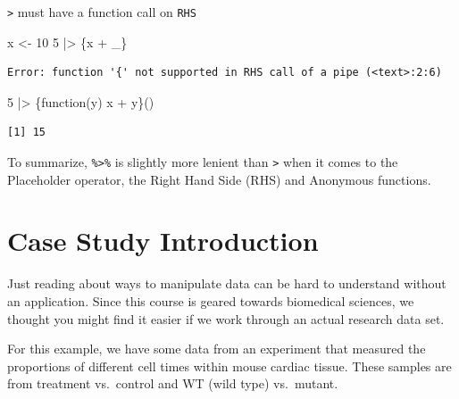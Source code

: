 \documentclass[
  letterpaper,
  DIV=11,
  numbers=noendperiod]{scrreprt}
\newenvironment{Shaded}{\begin{snugshade}}{\end{snugshade}}
\newcommand{\ControlFlowTok}[1]{\textcolor[rgb]{0.00,0.23,0.31}{#1}}
\newcommand{\DecValTok}[1]{\textcolor[rgb]{0.68,0.00,0.00}{#1}}
\newcommand{\NormalTok}[1]{\textcolor[rgb]{0.00,0.23,0.31}{#1}}
\newcommand{\OtherTok}[1]{\textcolor[rgb]{0.00,0.23,0.31}{#1}}
\newcommand{\SpecialCharTok}[1]{\textcolor[rgb]{0.37,0.37,0.37}{#1}}
\begin{document}
\begin{tcolorbox}
\begin{tcolorbox}
\texttt{\textbar{}\textgreater{}} must have a function call on
\texttt{RHS}

\begin{Shaded}
\begin{Highlighting}[]
\NormalTok{x }\OtherTok{\textless{}{-}} \DecValTok{10}
\DecValTok{5} \SpecialCharTok{|\textgreater{}}\NormalTok{ \{x }\SpecialCharTok{+}\NormalTok{ \_\}}
\end{Highlighting}
\end{Shaded}

\begin{verbatim}
Error: function '{' not supported in RHS call of a pipe (<text>:2:6)
\end{verbatim}

\begin{Shaded}
\begin{Highlighting}[]
\DecValTok{5} \SpecialCharTok{|\textgreater{}}\NormalTok{ \{}\ControlFlowTok{function}\NormalTok{(y) x }\SpecialCharTok{+}\NormalTok{ y\}()}
\end{Highlighting}
\end{Shaded}

\begin{verbatim}
[1] 15
\end{verbatim}

\end{tcolorbox}

To summarize, \texttt{\%\textgreater{}\%} is slightly more lenient than
\texttt{\textbar{}\textgreater{}} when it comes to the Placeholder
operator, the Right Hand Side (RHS) and Anonymous functions.

\end{tcolorbox}

\hypertarget{case-study-introduction}{%
\section{Case Study Introduction}\label{case-study-introduction}}

Just reading about ways to manipulate data can be hard to understand
without an application. Since this course is geared towards biomedical
sciences, we thought you might find it easier if we work through an
actual research data set.

For this example, we have some data from an experiment that measured the
proportions of different cell times within mouse cardiac tissue. These
samples are from treatment vs.~control and WT (wild type) vs.~mutant.
\end{document}
